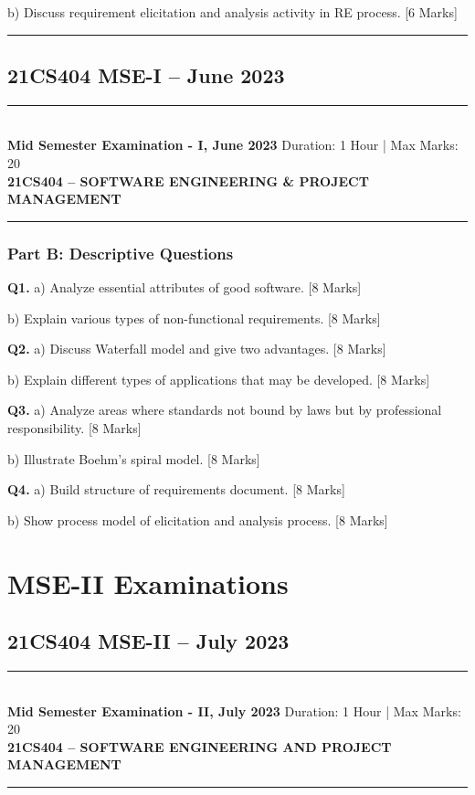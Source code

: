\documentclass[11pt,a4paper]{article}
\newcommand{\examheader}[4]{
\noindent\rule{\textwidth}{0.5pt}\\
\textbf{#1} \hfill Duration: #3 | Max Marks: #4\\
\textbf{#2}\\
\rule{\textwidth}{0.5pt}
\vspace{0.2cm}
}
\begin{document}
b) Discuss requirement elicitation and analysis activity in RE process. \hfill [6 Marks]

\vspace{0.5cm}
\hrule
\vspace{0.5cm}

\subsection{21CS404 MSE-I -- June 2023}
\examheader{Mid Semester Examination - I, June 2023}{21CS404 -- SOFTWARE ENGINEERING \& PROJECT MANAGEMENT}{1 Hour}{20}

\subsubsection*{Part B: Descriptive Questions}

\textbf{Q1.} a) Analyze essential attributes of good software. \hfill [8 Marks]

b) Explain various types of non-functional requirements. \hfill [8 Marks]

\textbf{Q2.} a) Discuss Waterfall model and give two advantages. \hfill [8 Marks]

b) Explain different types of applications that may be developed. \hfill [8 Marks]

\textbf{Q3.} a) Analyze areas where standards not bound by laws but by professional responsibility. \hfill [8 Marks]

b) Illustrate Boehm's spiral model. \hfill [8 Marks]

\textbf{Q4.} a) Build structure of requirements document. \hfill [8 Marks]

b) Show process model of elicitation and analysis process. \hfill [8 Marks]

\section{MSE-II Examinations}

\subsection{21CS404 MSE-II -- July 2023}
\examheader{Mid Semester Examination - II, July 2023}{21CS404 -- SOFTWARE ENGINEERING AND PROJECT MANAGEMENT}{1 Hour}{20}
\end{document}
